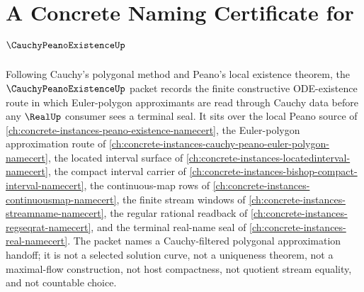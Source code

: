 \chapter{A Concrete Naming Certificate for $\CauchyPeanoExistenceUp$}
\label{ch:concrete-instances-cauchy-peano-existence-namecert}

Following Cauchy's polygonal method and Peano's local existence theorem, the $\CauchyPeanoExistenceUp$ packet records the finite constructive ODE-existence route in which Euler-polygon approximants are read through Cauchy data before any $\RealUp$ consumer sees a terminal seal. It sits over the local Peano source of \autoref{ch:concrete-instances-peano-existence-namecert}, the Euler-polygon approximation route of \autoref{ch:concrete-instances-cauchy-peano-euler-polygon-namecert}, the located interval surface of \autoref{ch:concrete-instances-locatedinterval-namecert}, the compact interval carrier of \autoref{ch:concrete-instances-bishop-compact-interval-namecert}, the continuous-map rows of \autoref{ch:concrete-instances-continuousmap-namecert}, the finite stream windows of \autoref{ch:concrete-instances-streamname-namecert}, the regular rational readback of \autoref{ch:concrete-instances-regseqrat-namecert}, and the terminal real-name seal of \autoref{ch:concrete-instances-real-namecert}. The packet names a Cauchy-filtered polygonal approximation handoff; it is not a selected solution curve, not a uniqueness theorem, not a maximal-flow construction, not host compactness, not quotient stream equality, and not countable choice.

